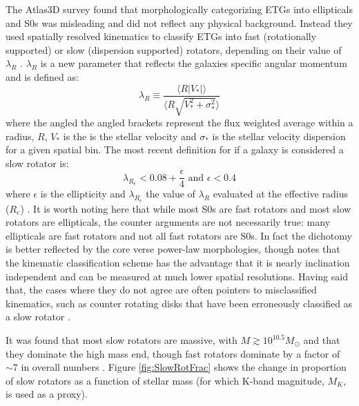 	The Atlas3D survey \citep{Cappellari2011} found that morphologically categorizing ETGs into ellipticals and S0s was misleading and did not reflect any physical background. Instead they used spatially resolved kinematics to classify ETGs into fast (rotationally supported) or slow (dispersion supported) rotators, depending on their value of $\lambda_R$ \citep{Emsellem2011}. $\lambda_R$ is a new parameter that reflects the galaxies specific angular momentum and is defined as:
	\begin{equation}
		\lambda_R \equiv \frac{\langle R |V_\ast|\rangle}{\langle R \sqrt{V_\ast^2 + \sigma_\ast^2}\rangle}
	\end{equation}
	where the angled the angled brackets represent the flux weighted average within a radius, $R$, $V_\ast$ is the is the stellar velocity and $\sigma_\ast$ is the stellar velocity dispersion for a given spatial bin. The most recent definition for if a galaxy is considered a slow rotator is:
	\begin{equation}
		\lambda_{R_e} < 0.08 + \frac{\epsilon}{4} \text{  and  } \epsilon < 0.4
	\end{equation}
	where $\epsilon$ is the ellipticity and $\lambda_{R_e}$ the value of $\lambda_R$ evaluated at the effective radius ($R_e$) \citep{}. %
	It is worth noting here that while most S0s are fast rotators and most slow rotators are ellipticals, the counter arguments are not necessarily true: many ellipticals are fast rotators and not all fast rotators are S0s. In fact the dichotomy is better reflected by the core verse power-law morphologies, though \citet{Cappellari2016} notes that the kinematic classification scheme has the advantage that it is nearly inclination independent and can be measured at much lower spatial resolutions. Having said that, the cases where they do not agree are often pointers to misclassified kinematics, such as counter rotating disks that have been erroneously classified as a slow rotator \citep{Pinkney2003, Cappellari2005, Cappellari2007}. 

	It was found that most slow rotators are massive, with $M \gtrsim 10^{10.5} M_\odot$ and that they dominate the high mass end, though fast rotators dominate by a factor of $\sim 7$ in overall numbers \citep{Emsellem2011, Veale2016}. Figure \ref{fig:SlowRotFrac} shows the change in proportion of slow rotators as a function of stellar mass (for which K-band magnitude, $M_K$, is used as a proxy).


